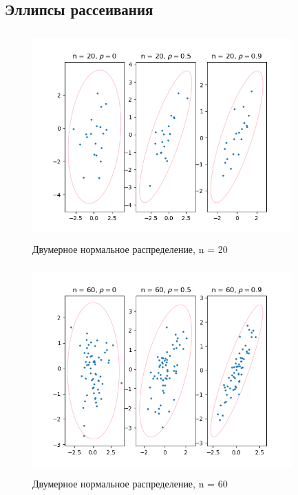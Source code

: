 \subsection{Эллипсы рассеивания}
	
	\begin{figure}[H]
		\centering
		\includegraphics[width = 10cm, height = 8cm]{pics/n20.png}
		\caption{Двумерное нормальное распределение, n = 20}
		\label{fig:n20}
	\end{figure}
	
	\begin{figure}[H]
		\centering
		\includegraphics[width = 10cm, height = 8cm]{pics/n60.png}
		\caption{Двумерное нормальное распределение, n = 60}
		\label{fig:n60}
	\end{figure}

